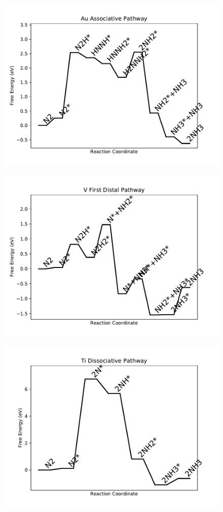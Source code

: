 \begin{figure}
\includegraphics[width=0.8\linewidth]{data/plots/Au_associative.pdf}
\label{fig:Au_associative}
\end{figure}

\begin{figure}
\includegraphics[width=0.8\linewidth]{data/plots/V_distal_1.pdf}
\label{fig:V_distal_1}
\end{figure}

\begin{figure}
\includegraphics[width=0.8\linewidth]{data/plots/Ti_dissociative.pdf}
\label{fig:Ti_dissociative}
\end{figure}

